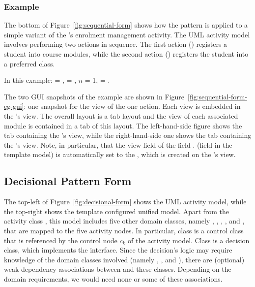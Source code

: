 \subsubsection*{Example}
The bottom of Figure~\ref{fig:sequential-form} shows how the pattern is applied to a simple variant of the \courseman's enrolment management activity. The UML activity model involves performing two actions in sequence. The first action () registers a student into course modules, while the second action () registers the student into a preferred class.

In this example:  = ,  = , $ n $ = 1,  = .

The two GUI snapshots of the example are shown in Figure~\ref{fig:sequential-form-eg-gui}: one snapshot for the view of the one action. Each view is embedded in the 's view. The overall layout is a tab layout and the view of each associated module is contained in a tab of this layout. The left-hand-side figure shows the tab containing the 's view, while the right-hand-side one shows the tab containing the 's view. Note, in particular, that the view field of the field . (field  in the template model) is automatically set to the , which is created on the 's view.

\subsection{Decisional Pattern Form} \label{sect:decisional-pattern}

The top-left of Figure~\ref{fig:decisional-form} shows the UML activity model, while the top-right shows the template configured unified model. Apart from the activity class , this model includes five other domain classes, namely , , , , and , that are mapped to the five activity nodes. In particular, class  is a control class that is referenced by the control node $c_k$ of the activity model. 
Class  is a decision class, which implements the  interface.
%
Since the decision's logic may require knowledge of the domain classes involved (namely , , and ), there are (optional) weak dependency associations between  and these classes. Depending on the domain requirements, we would need none or some of these associations.

